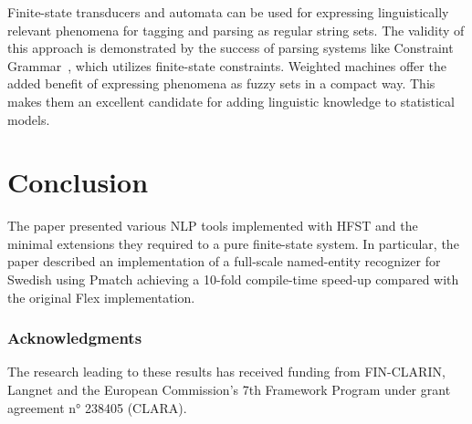\documentclass{llncs}
\begin{document}
Finite-state transducers and automata can be used for expressing
linguistically relevant phenomena for tagging and parsing as regular
string sets. The validity of this approach is demonstrated by the
success of parsing systems like Constraint
Grammar~\cite{karlsson/1990}, which utilizes finite-state
constraints. Weighted machines offer the added benefit of expressing
phenomena as fuzzy sets in a compact way. This makes them an excellent
candidate for adding linguistic knowledge to statistical models.

\section{Conclusion}\label{hfst:conclusion}
The paper presented various NLP tools implemented with HFST and the minimal extensions they required to a pure finite-state system. In particular, the paper described an implementation of a full-scale named-entity recognizer for Swedish using Pmatch achieving a 10-fold compile-time speed-up compared with the original Flex implementation.

\subsubsection*{Acknowledgments}
The research leading to these results has received funding from FIN-CLARIN, Langnet and the
European Commission's 7th Framework Program under grant agreement n° 238405 (CLARA).




\end{document}
